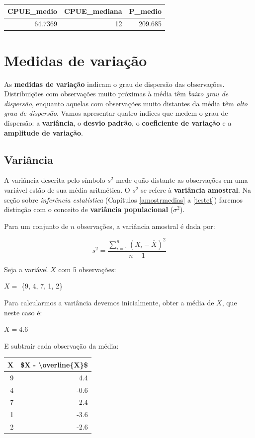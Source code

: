 \documentclass[
]{book}
\begin{document}
\begin{tabular}{r|r|r}
\hline
CPUE\_medio & CPUE\_mediana & P\_medio\\
\hline
64.7369 & 12 & 209.685\\
\hline
\end{tabular}

\hypertarget{variacao}{%
\chapter{Medidas de variação}\label{variacao}}

As \textbf{medidas de variação} indicam o grau de dispersão das observações. Distribuições com observações muito próximas à média têm \emph{baixo grau de dispersão}, enquanto aquelas com observações muito distantes da média têm \emph{alto grau de dispersão}. Vamos apresentar quatro índices que medem o grau de dispersão: a \textbf{variância}, o \textbf{desvio padrão}, o \textbf{coeficiente de variação} e a \textbf{amplitude de variação}.

\hypertarget{variuxe2ncia}{%
\section{Variância}\label{variuxe2ncia}}

A variância descrita pelo símbolo \(s^2\) mede quão distante as observações em uma variável estão de sua média aritmética. O \(s^2\) se refere à \textbf{variância amostral}. Na seção sobre \emph{inferência estatística} (Capítulos \ref{amostrmedias} a \ref{testet}) faremos distinção com o conceito de \textbf{variância populacional} (\(\sigma^2\)).

Para um conjunto de \(n\) observações, a variância amostral é dada por:

\[s^2=\frac{\sum_{i=1}^n{(X_i - \overline{X})^2}}{n-1}\]

Seja a variável \(X\) com 5 observações:

\(X =\) \{9, 4, 7, 1, 2\}

Para calcularmos a variância devemos inicialmente, obter a média de \(X\), que neste caso é:

\(\overline{X} = 4.6\)

E subtrair cada observação da média:

\begin{tabular}{r|r}
\hline
X & \$X - \textbackslash{}overline\{X\}\$\\
\hline
9 & 4.4\\
\hline
4 & -0.6\\
\hline
7 & 2.4\\
\hline
1 & -3.6\\
\hline
2 & -2.6\\
\hline
\end{tabular}
\end{document}
